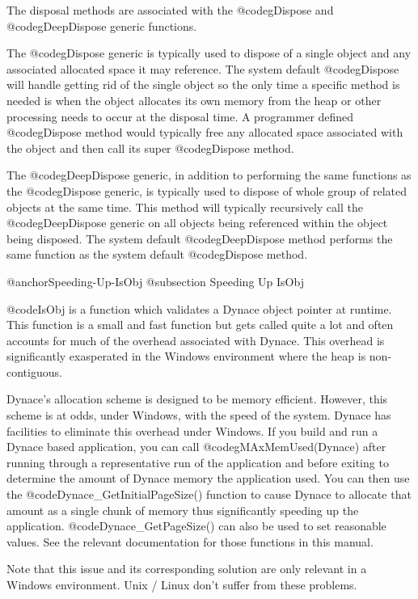 The disposal methods are associated with the @code{gDispose}
and @code{gDeepDispose} generic functions.

The @code{gDispose} generic is typically used to dispose of a single
object and any associated allocated space it may reference.  The system
default @code{gDispose} will handle getting rid of the single object so
the only time a specific method is needed is when the object
allocates its own memory from the heap or other processing needs to
occur at the disposal time.  A programmer defined @code{gDispose} method
would typically free any allocated space associated with the object and
then call its super @code{gDispose} method.

The @code{gDeepDispose} generic, in addition to performing the same
functions as the @code{gDispose} generic, is typically used to dispose
of whole group of related objects at the same time.  This method will
typically recursively call the @code{gDeepDispose} generic on all
objects being referenced within the object being disposed.  The system
default @code{gDeepDispose} method performs the same function as the
system default @code{gDispose} method.

@anchor{Speeding-Up-IsObj}
@subsection Speeding Up IsObj

@code{IsObj} is a function which validates a Dynace object pointer at
runtime.  This function is a small and fast function but gets called
quite a lot and often accounts for much of the overhead associated
with Dynace.  This overhead is significantly exasperated in the
Windows environment where the heap is non-contiguous.

Dynace's allocation scheme is designed to be memory efficient.
However, this scheme is at odds, under Windows, with the speed of the
system. Dynace has facilities to eliminate this overhead under
Windows.  If you build and run a Dynace based application, you can
call @code{gMAxMemUsed(Dynace)} after running through a representative
run of the application and before exiting to determine the amount of
Dynace memory the application used.  You can then use the
@code{Dynace_GetInitialPageSize()} function to cause Dynace to
allocate that amount as a single chunk of memory thus significantly
speeding up the application.  @code{Dynace_GetPageSize()} can also
be used to set reasonable values.  See the relevant documentation
for those functions in this manual.

Note that this issue and its corresponding solution are only relevant
in a Windows environment.  Unix / Linux don't suffer from these problems.


